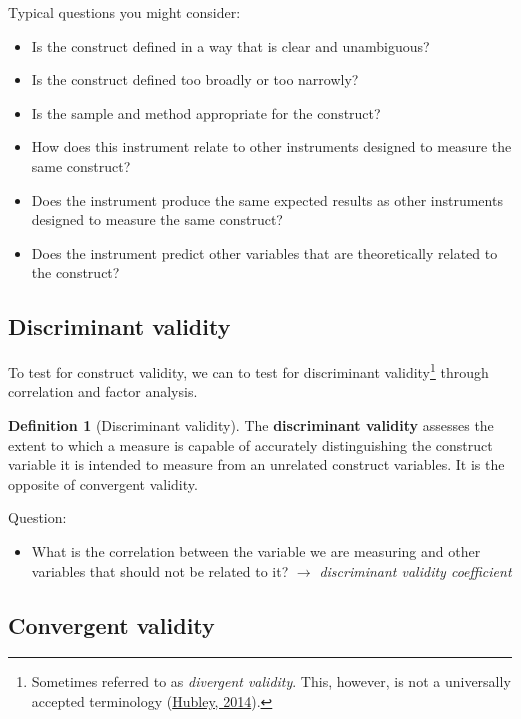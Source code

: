 \documentclass[
  11pt,
]{book}
\providecommand{\tightlist}{%
  \setlength{\itemsep}{0pt}\setlength{\parskip}{0pt}}
\theoremstyle{definition}
\newtheorem{definition}{Definition}[chapter]
\theoremstyle{definition}
\theoremstyle{definition}
\theoremstyle{definition}
\theoremstyle{remark}
\begin{document}
Typical questions you might consider:

\begin{itemize}
\tightlist
\item
  Is the construct defined in a way that is clear and unambiguous?
\item
  Is the construct defined too broadly or too narrowly?
\item
  Is the sample and method appropriate for the construct?
\item
  How does this instrument relate to other instruments designed to measure the same construct?
\item
  Does the instrument produce the same expected results as other instruments designed to measure the same construct?
\item
  Does the instrument predict other variables that are theoretically related to the construct?
\end{itemize}

\hypertarget{discriminant-validity}{%
\subsection{Discriminant validity}\label{discriminant-validity}}

To test for construct validity, we can to test for discriminant validity\footnote{Sometimes referred to as \emph{divergent validity}. This, however, is not a universally accepted terminology (\protect\hyperlink{ref-hubleyDivergentValidity2014}{Hubley, 2014}).} through correlation and factor analysis.

\begin{definition}[Discriminant validity]
\protect\hypertarget{def:defdiscriminantvalidity}{}\label{def:defdiscriminantvalidity}The \textbf{discriminant validity} assesses the extent to which a measure is capable of accurately distinguishing the construct variable it is intended to measure from an unrelated construct variables. It is the opposite of convergent validity.
\end{definition}

Question:

\begin{itemize}
\tightlist
\item
  What is the correlation between the variable we are measuring and other variables that should not be related to it? \(\rightarrow\) \emph{discriminant validity coefficient}
\end{itemize}

\hypertarget{convergent-validity}{%
\subsection{Convergent validity}\label{convergent-validity}}
\end{document}
